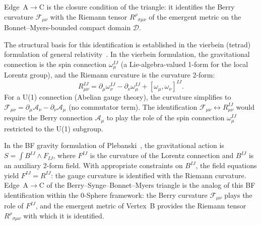 \documentclass[%
 reprint, amsmath,amssymb, aps, prd, ]{revtex4-2}
\numberwithin{equation}{section}
\newcommand{\BerryA}{\mathcal{A}}
\newcommand{\BerryF}{\mathcal{F}}
\begin{document}
Edge~A$\to$C is the closure condition of the triangle: it identifies the Berry curvature $\BerryF_{\mu\nu}$ with the Riemann tensor $R^\rho{}_{\sigma\mu\nu}$ of the emergent metric on the Bonnet--Myers-bounded compact domain $\mathcal{D}$.

The structural basis for this identification is established in the vierbein (tetrad) formulation of general relativity~\cite{MTW1973,Nakahara2003}.
In the vierbein formulation, the gravitational connection is the spin connection $\omega^{IJ}_\mu$ (a Lie-algebra-valued 1-form for the local Lorentz group), and the Riemann curvature is the curvature 2-form:
\begin{equation}
R^{IJ}_{\mu\nu} = \partial_\mu \omega^{IJ}_\nu - \partial_\nu \omega^{IJ}_\mu + [\omega_\mu, \omega_\nu]^{IJ}.
\label{eq:riemann_spin}
\end{equation}
For a U(1) connection (Abelian gauge theory), the curvature simplifies to $\BerryF_{\mu\nu} = \partial_\mu \BerryA_\nu - \partial_\nu \BerryA_\mu$ (no commutator term).
The identification $\BerryF_{\mu\nu} \leftrightarrow R^{IJ}_{\mu\nu}$ would require the Berry connection $\BerryA_\mu$ to play the role of the spin connection $\omega^{IJ}_\mu$ restricted to the U(1) subgroup.

In the BF gravity formulation of Plebanski~\cite{Plebanski1977}, the gravitational action is $S = \int B^{IJ} \wedge F_{IJ}$, where $F^{IJ}$ is the curvature of the Lorentz connection and $B^{IJ}$ is an auxiliary 2-form field.
With appropriate constraints on $B^{IJ}$, the field equations yield $F^{IJ} = R^{IJ}$: the gauge curvature is identified with the Riemann curvature.
Edge~A$\to$C of the Berry--Synge--Bonnet--Myers triangle is the analog of this BF identification within the 0-Sphere framework: the Berry curvature $\BerryF_{\mu\nu}$ plays the role of $F^{IJ}$, and the emergent metric of Vertex~B provides the Riemann tensor $R^\rho{}_{\sigma\mu\nu}$ with which it is identified.
\end{document}

